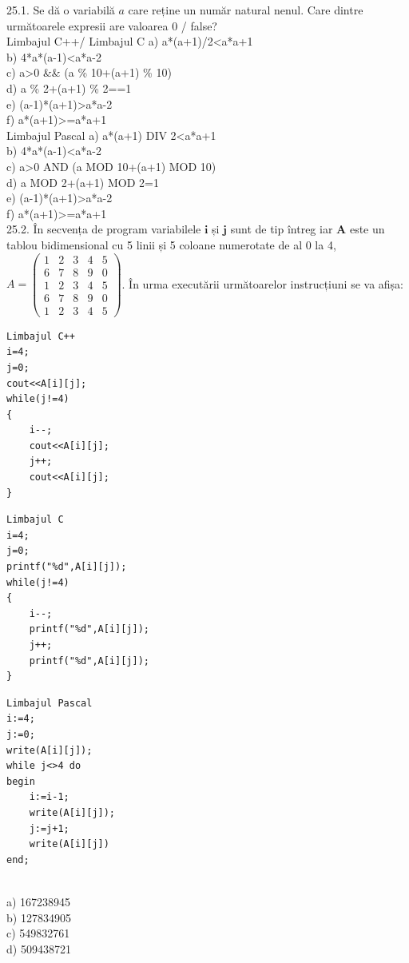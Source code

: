 {{25.1. Se dă o variabilă $a$ care reține un număr natural nenul. Care dintre următoarele expresii are valoarea 0 / false?
\\
Limbajul C++/ Limbajul C
a) a*(a+1)/2<a*a+1
\\
b) 4*a*(a-1)<a*a-2
\\
c) a>0 \&\& (a \% 10+(a+1) \% 10)
\\
d) a \% 2+(a+1) \% 2==1
\\
e) (a-1)*(a+1)>a*a-2
\\
f) a*(a+1)>=a*a+1
\\
Limbajul Pascal
a) a*(a+1) DIV 2<a*a+1
\\
b) 4*a*(a-1)<a*a-2
\\
c) a>0 AND (a MOD 10+(a+1) MOD 10)
\\
d) a MOD 2+(a+1) MOD 2=1
\\
e) (a-1)*(a+1)>a*a-2
\\
f) a*(a+1)>=a*a+1
\\
25.2. În secvența de program variabilele $\mathbf{i}$ și $\mathbf{j}$ sunt de tip întreg iar $\mathbf{A}$ este un tablou bidimensional cu 5 linii și 5 coloane numerotate de al 0 la 4,
$A=\left(\begin{array}{lllll}1 & 2 & 3 & 4 & 5 \\ 6 & 7 & 8 & 9 & 0 \\ 1 & 2 & 3 & 4 & 5 \\ 6 & 7 & 8 & 9 & 0 \\ 1 & 2 & 3 & 4 & 5\end{array}\right)$. În urma executării următoarelor instrucțiuni se va afiṣa:
\\
\begin{verbatim}
Limbajul C++
i=4;
j=0;
cout<<A[i][j];
while(j!=4)
{
    i--;
    cout<<A[i][j];
    j++;
    cout<<A[i][j];
}
\end{verbatim}
\begin{verbatim}
Limbajul C
i=4;
j=0;
printf("%d",A[i][j]);
while(j!=4)
{
    i--;
    printf("%d",A[i][j]);
    j++;
    printf("%d",A[i][j]);
}
\end{verbatim}
\begin{verbatim}
Limbajul Pascal
i:=4;
j:=0;
write(A[i][j]);
while j<>4 do
begin
    i:=i-1;
    write(A[i][j]);
    j:=j+1;
    write(A[i][j])
end;
\end{verbatim}
\\
a) 167238945
\\
b) 127834905
\\
c) 549832761
\\
d) 509438721
}}
